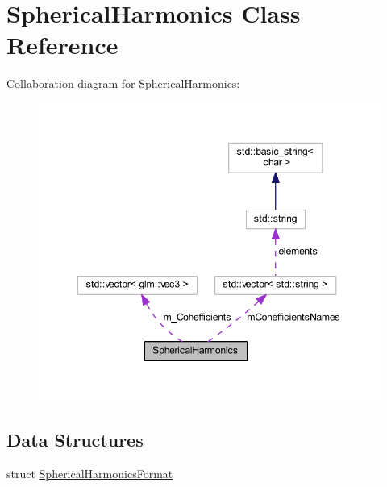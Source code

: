 \hypertarget{class_spherical_harmonics}{}\section{Spherical\+Harmonics Class Reference}
\label{class_spherical_harmonics}


Collaboration diagram for Spherical\+Harmonics\+:
\nopagebreak
\begin{figure}[H]
\begin{center}
\leavevmode
\includegraphics[width=347pt]{class_spherical_harmonics__coll__graph}
\end{center}
\end{figure}
\subsection*{Data Structures}
\begin{DoxyCompactItemize}
\item 
struct \hyperlink{struct_spherical_harmonics_1_1_spherical_harmonics_format}{Spherical\+Harmonics\+Format}
\end{DoxyCompactItemize}
